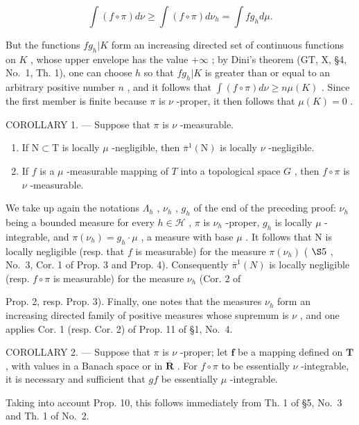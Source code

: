 \[
\int (f \circ \pi) d \nu \geqslant \int (f \circ \pi) d \nu_ {h} = \int f g _ {h} d \mu .
\]

But the functions \(fg_h|K\) form an increasing directed set of continuous functions on \(K\) , whose upper envelope has the value \(+\infty\) ; by Dini's theorem (GT, X, §4, No.~1, Th. 1), one can choose \(h\) so that \(fg_h|K\) is greater than or equal to an arbitrary positive number \(n\) , and it follows that \(\int(f \circ \pi) d\nu \geqslant n \mu(K)\) . Since the first member is finite because \(\pi\) is \(\nu\) -proper, it then follows that \(\mu(K) = 0\) .

COROLLARY 1. --- Suppose that \(\pi\) is \(\nu\) -measurable.

\begin{enumerate}
\def\labelenumi{\alph{enumi})}
\item
  If \(\mathrm{N}\subset \mathrm{T}\) is locally \(\mu\) -negligible, then \(\overline{\pi}^{1}(\mathrm{N})\) is locally \(\nu\) -negligible.
\item
  If \(f\) is a \(\mu\) -measurable mapping of \(T\) into a topological space \(G\) , then \(f \circ \pi\) is \(\nu\) -measurable.
\end{enumerate}

We take up again the notations \(\Lambda_h\) , \(\nu_h\) , \(g_h\) of the end of the preceding proof: \(\nu_h\) being a bounded measure for every \(h \in \mathcal{H}\) , \(\pi\) is \(\nu_h\) -proper, \(g_h\) is locally \(\mu\) -integrable, and \(\pi(\nu_h) = g_h \cdot \mu\) , a measure with base \(\mu\) . It follows that N is locally negligible (resp. that \(f\) is measurable) for the measure \(\pi(\nu_h)\) ( \(\S 5\) , No.~3, Cor. 1 of Prop. 3 and Prop. 4). Consequently \(\overline{\pi}^1(N)\) is locally negligible (resp. \(f \circ \pi\) is measurable) for the measure \(\nu_h\) (Cor. 2 of

Prop. 2, resp. Prop. 3). Finally, one notes that the measures \(\nu_{h}\) form an increasing directed family of positive measures whose supremum is \(\nu\) , and one applies Cor. 1 (resp. Cor. 2) of Prop. 11 of §1, No.~4.

COROLLARY 2. --- Suppose that \(\pi\) is \(\nu\) -proper; let \(\mathbf{f}\) be a mapping defined on \(\mathbf{T}\) , with values in a Banach space or in \(\overline{\mathbf{R}}\) . For \(f \circ \pi\) to be essentially \(\nu\) -integrable, it is necessary and sufficient that \(gf\) be essentially \(\mu\) -integrable.

Taking into account Prop. 10, this follows immediately from Th. 1 of §5, No.~3 and Th. 1 of No.~2.

